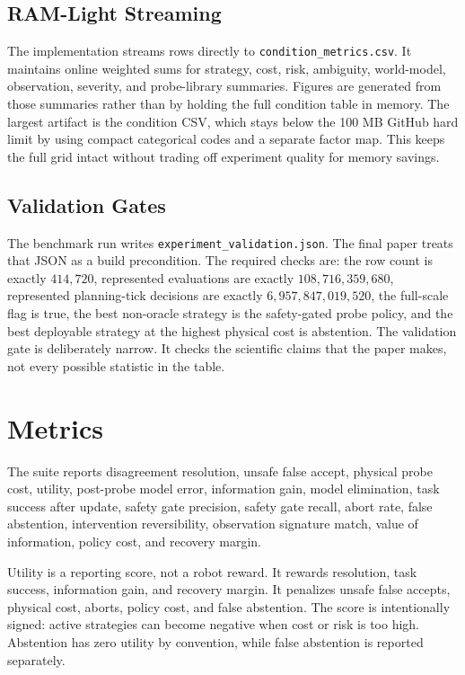 \documentclass{article}
\begin{document}
\subsection{RAM-Light Streaming}

The implementation streams rows directly to \texttt{condition\_metrics.csv}. It maintains online weighted sums for strategy, cost, risk, ambiguity, world-model, observation, severity, and probe-library summaries. Figures are generated from those summaries rather than by holding the full condition table in memory. The largest artifact is the condition CSV, which stays below the 100 MB GitHub hard limit by using compact categorical codes and a separate factor map. This keeps the full grid intact without trading off experiment quality for memory savings.

\subsection{Validation Gates}

The benchmark run writes \texttt{experiment\_validation.json}. The final paper treats that JSON as a build precondition. The required checks are: the row count is exactly $414{,}720$, represented evaluations are exactly $108{,}716{,}359{,}680$, represented planning-tick decisions are exactly $6{,}957{,}847{,}019{,}520$, the full-scale flag is true, the best non-oracle strategy is the safety-gated probe policy, and the best deployable strategy at the highest physical cost is abstention. The validation gate is deliberately narrow. It checks the scientific claims that the paper makes, not every possible statistic in the table.

\section{Metrics}

The suite reports disagreement resolution, unsafe false accept, physical probe cost, utility, post-probe model error, information gain, model elimination, task success after update, safety gate precision, safety gate recall, abort rate, false abstention, intervention reversibility, observation signature match, value of information, policy cost, and recovery margin.

Utility is a reporting score, not a robot reward. It rewards resolution, task success, information gain, and recovery margin. It penalizes unsafe false accepts, physical cost, aborts, policy cost, and false abstention. The score is intentionally signed: active strategies can become negative when cost or risk is too high. Abstention has zero utility by convention, while false abstention is reported separately.
\end{document}
